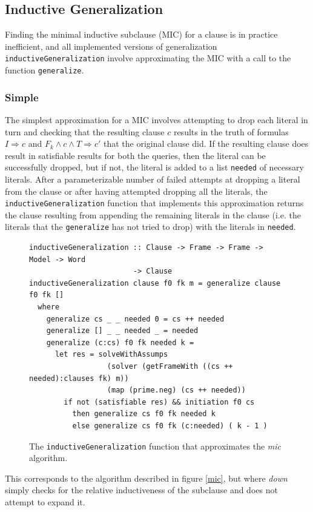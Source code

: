 \documentclass[12pt,a4paper,twoside,openright]{report}
\begin{document}
{\subsection{Inductive Generalization}
Finding the minimal inductive subclause (MIC) for a clause is in practice inefficient,
and all implemented versions of generalization
\verb,inductiveGeneralization, involve approximating the MIC with a call to the function
\verb,generalize,.

\subsubsection{Simple}
The simplest approximation for a MIC involves attempting to drop each literal in turn and checking
that the resulting clause $c$ results in the truth of formulas $I \Rightarrow c$ and
$F_k \wedge c \wedge T \Rightarrow c'$ that the original clause did. If the resulting clause
does result in satisfiable results for both the queries, then the literal can be successfully dropped,
but if not, the literal is added to a list \verb,needed, of necessary literals.
After a parameterizable number of failed attempts at dropping a literal from the clause or after
having attempted dropping all the literals, the
\verb,inductiveGeneralization, function that implements this approximation
returns the clause resulting from appending the remaining
literals in the clause (i.e. the literals that the \verb,generalize, has not tried to drop)
with the literals in \verb,needed,.

\begin{figure}[!Ht]
\centering
\begin{lstlisting}
inductiveGeneralization :: Clause -> Frame -> Frame -> Model -> Word
                        -> Clause
inductiveGeneralization clause f0 fk m = generalize clause f0 fk []
  where
    generalize cs _ _ needed 0 = cs ++ needed
    generalize [] _ _ needed _ = needed
    generalize (c:cs) f0 fk needed k = 
      let res = solveWithAssumps
                  (solver (getFrameWith ((cs ++ needed):clauses fk) m))
                  (map (prime.neg) (cs ++ needed))
        if not (satisfiable res) && initiation f0 cs
          then generalize cs f0 fk needed k
          else generalize cs f0 fk (c:needed) ( k - 1 ) 
\end{lstlisting}
\caption{The {\tt inductiveGeneralization} function that approximates the {\it mic} algorithm.}
\end{figure}

This corresponds to the algorithm described in figure \ref{mic}, but where {\it down} simply
checks for the relative inductiveness of the subclause and does not attempt to expand it.

}
\end{document}
